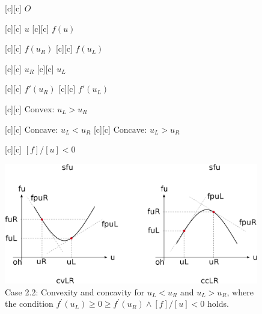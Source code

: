 \begin{figure}[ht]
	\centering
	\footnotesize

	[c] {$O$}

	[c] {$u$}
	[c] {$f(u)$}

	[c] {$f(u_{R})$}
	[c] {$f(u_{L})$}

	[c] {$u_{R}$}
	[c] {$u_{L}$}

	[c] {$f'(u_{R})$}
	[c] {$f'(u_{L})$}

	[c] {$\text{Convex: } u_{L} > u_{R}$}

	[c] {$\text{Concave: } u_{L} < u_{R}$}
	[c] {$\text{Concave: } u_{L} > u_{R}$}

	[c] {$[f]/[u]<0$}

	\includegraphics[width=0.99\textwidth]{convexityfu_case22.eps}
	\caption{Case 2.2:
	Convexity and concavity for $u_{L} < u_{R}$ and $u_{L} > u_{R}$,
	where the condition $f^\prime(u_L) \geq 0 \geq f^\prime(u_R) \wedge [f]/[u]<0$
	holds.}
	\label{\LABEL}
\end{figure}